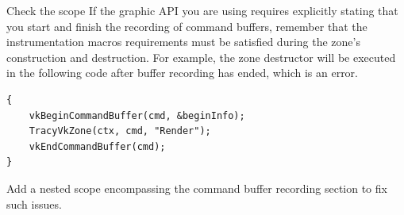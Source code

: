 \documentclass[hidelinks,titlepage,a4paper,twoside]{article}
\begin{document}
\begin{bclogo}[
noborder=true,
couleur=black!5,
logo=\bclampe
]{Check the scope}
If the graphic API you are using requires explicitly stating that you start and finish the recording of command buffers, remember that the instrumentation macros requirements must be satisfied during the zone's construction and destruction. For example, the zone destructor will be executed in the following code after buffer recording has ended, which is an error.

\begin{lstlisting}
{
    vkBeginCommandBuffer(cmd, &beginInfo);
    TracyVkZone(ctx, cmd, "Render");
    vkEndCommandBuffer(cmd);
}
\end{lstlisting}

Add a nested scope encompassing the command buffer recording section to fix such issues.
\end{bclogo}
\end{document}
